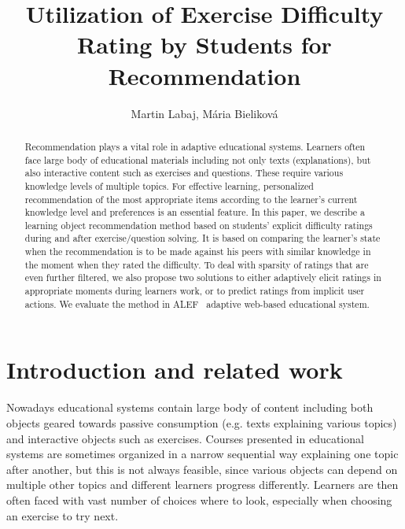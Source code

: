 \documentclass{llncs}
\begin{document}
\sloppy

\title{Utilization of Exercise Difficulty Rating by Students for Recommendation}
\titlerunning{}
\author{Martin Labaj, M\'{a}ria Bielikov\'{a}}
\authorrunning{}

\maketitle


\begin{abstract}
Recommendation plays a vital role in adaptive educational systems. Learners often face large body of educational materials including not only texts (explanations), but also interactive content such as exercises and questions. These require various knowledge levels of multiple topics. For effective learning, personalized recommendation of the most appropriate items according to the learner's current knowledge level and preferences is an essential feature. In this paper, we describe a learning object recommendation method based on students’ explicit difficulty ratings during and after exercise/question solving. It is based on comparing the learner’s state when the recommendation is to be made against his peers with similar knowledge in the moment when they rated the difficulty. To deal with sparsity of ratings that are even further filtered, we also propose two solutions to either adaptively elicit ratings in appropriate moments during learners work, or to predict ratings from implicit user actions. We evaluate the method in ALEF \textendash~adaptive web-based educational system.

\end{abstract}

\section{Introduction and related work}
\label{sec1}

Nowadays educational systems contain large body of content including both objects geared towards passive consumption (e.g. texts explaining various topics) and interactive objects such as exercises. Courses presented in educational systems are sometimes organized in a narrow sequential way explaining one topic after another, but this is not always feasible, since various objects can depend on multiple other topics and different learners progress differently. Learners are then often faced with vast number of choices where to look, especially when choosing an exercise to try next.
\end{document}
